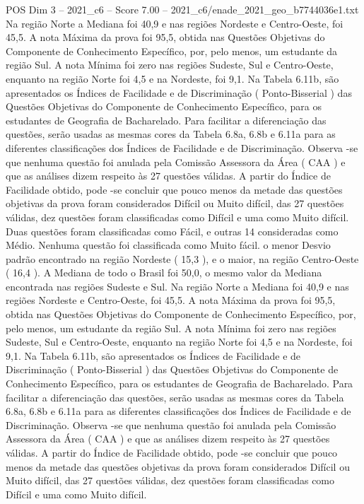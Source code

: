 \begin{textsample}{POS Dim 3 – 2021\_c6 – Score 7.00 – 2021\_c6/enade\_2021\_geo\_b7744036e1.txt}
Na região Norte a Mediana foi 40,9 e nas regiões Nordeste e Centro-Oeste, foi 45,5.
A nota Máxima da prova foi 95,5, obtida nas Questões Objetivas do Componente de Conhecimento Específico, por, pelo menos, um estudante da região Sul.
A nota Mínima foi zero nas regiões Sudeste, Sul e Centro-Oeste, enquanto na região Norte foi 4,5 e na Nordeste, foi 9,1.
Na Tabela 6.11b, são apresentados os Índices de Facilidade e de Discriminação ( Ponto-Bisserial ) das Questões Objetivas do Componente de Conhecimento Específico, para os estudantes de Geografia de Bacharelado.
Para facilitar a diferenciação das questões, serão usadas as mesmas cores da Tabela 6.8a, 6.8b e 6.11a para as diferentes classificações dos Índices de Facilidade e de Discriminação.
Observa -se que nenhuma questão foi anulada pela Comissão Assessora da Área ( CAA ) e que as análises dizem respeito às 27 questões válidas.
A partir do Índice de Facilidade obtido, pode -se concluir que pouco menos da metade das questões objetivas da prova foram considerados Difícil ou Muito difícil, das 27 questões válidas, dez questões foram classificadas como Difícil e uma como Muito difícil.
Duas questões foram classificadas como Fácil, e outras 14 consideradas como Médio.
Nenhuma questão foi classificada como Muito fácil. o menor Desvio padrão encontrado na região Nordeste ( 15,3 ), e o maior, na região Centro-Oeste ( 16,4 ).
A Mediana de todo o Brasil foi 50,0, o mesmo valor da Mediana encontrada nas regiões Sudeste e Sul.
Na região Norte a Mediana foi 40,9 e nas regiões Nordeste e Centro-Oeste, foi 45,5.
A nota Máxima da prova foi 95,5, obtida nas Questões Objetivas do Componente de Conhecimento Específico, por, pelo menos, um estudante da região Sul.
A nota Mínima foi zero nas regiões Sudeste, Sul e Centro-Oeste, enquanto na região Norte foi 4,5 e na Nordeste, foi 9,1.
Na Tabela 6.11b, são apresentados os Índices de Facilidade e de Discriminação ( Ponto-Bisserial ) das Questões Objetivas do Componente de Conhecimento Específico, para os estudantes de Geografia de Bacharelado.
Para facilitar a diferenciação das questões, serão usadas as mesmas cores da Tabela 6.8a, 6.8b e 6.11a para as diferentes classificações dos Índices de Facilidade e de Discriminação.
Observa -se que nenhuma questão foi anulada pela Comissão Assessora da Área ( CAA ) e que as análises dizem respeito às 27 questões válidas.
A partir do Índice de Facilidade obtido, pode -se concluir que pouco menos da metade das questões objetivas da prova foram considerados Difícil ou Muito difícil, das 27 questões válidas, dez questões foram classificadas como Difícil e uma como Muito difícil.

\end{textsample}
